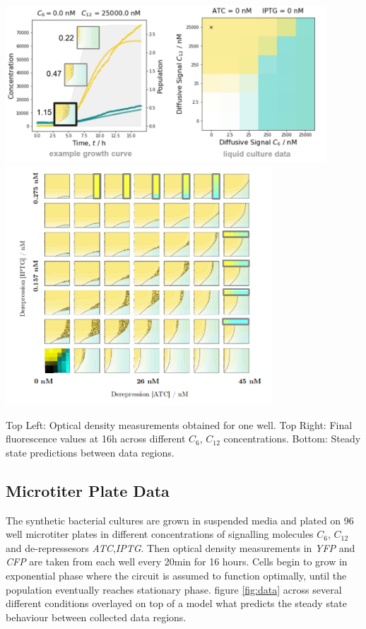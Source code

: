 \begin{Figure}

\includegraphics[width=120mm]{figures/microtiter.png}
\includegraphics[width=100mm]{figures/parameter-space.png}
\caption{Top Left: Optical density measurements obtained for one well.
Top Right: Final fluorescence values at 16h across different $C_6$, $C_{12}$
concentrations. Bottom: Steady state predictions between data regions.}
\label{fig:data}
\end{Figure}

\subsection{Microtiter Plate Data}
The synthetic bacterial cultures are grown in suspended media and plated on
96 well microtiter plates in different concentrations of signalling molecules
$C_6$, $C_{12}$ and de-repressesors \textit{ATC},\textit{IPTG}. Then
optical density measurements in \textit{YFP} and \textit{CFP} are taken
from each well every 20min for 16 hours. Cells begin to grow in exponential
phase where the circuit is assumed to function optimally, until the
population eventually reaches stationary phase. figure \ref{fig:data} across
several different conditions overlayed on top of a model what predicts
the steady state behaviour between collected data regions.

